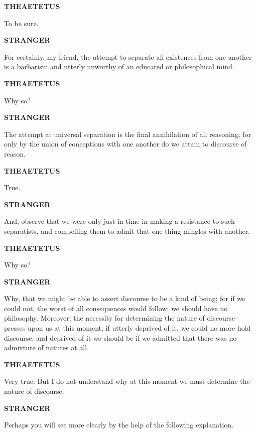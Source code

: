 \documentclass[11pt,letter]{article}
\begin{document}
\par \textbf{THEAETETUS}
\par   To be sure.

\par \textbf{STRANGER}
\par   For certainly, my friend, the attempt to separate all existences from one another is a barbarism and utterly unworthy of an educated or philosophical mind.

\par \textbf{THEAETETUS}
\par   Why so?

\par \textbf{STRANGER}
\par   The attempt at universal separation is the final annihilation of all reasoning; for only by the union of conceptions with one another do we attain to discourse of reason.

\par \textbf{THEAETETUS}
\par   True.

\par \textbf{STRANGER}
\par   And, observe that we were only just in time in making a resistance to such separatists, and compelling them to admit that one thing mingles with another.

\par \textbf{THEAETETUS}
\par   Why so?

\par \textbf{STRANGER}
\par   Why, that we might be able to assert discourse to be a kind of being; for if we could not, the worst of all consequences would follow; we should have no philosophy. Moreover, the necessity for determining the nature of discourse presses upon us at this moment; if utterly deprived of it, we could no more hold discourse; and deprived of it we should be if we admitted that there was no admixture of natures at all.

\par \textbf{THEAETETUS}
\par   Very true. But I do not understand why at this moment we must determine the nature of discourse.

\par \textbf{STRANGER}
\par   Perhaps you will see more clearly by the help of the following explanation.
\end{document}
